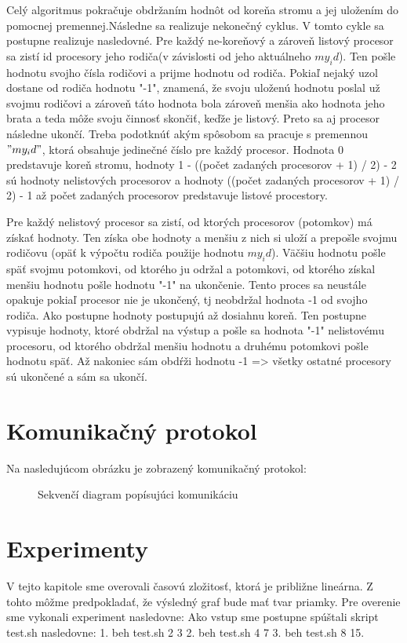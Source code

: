 \documentclass[11pt,a4paper,titlepage,final]{article}
\begin{document}
Celý algoritmus pokračuje obdržaním hodnôt od koreňa stromu a jej uložením do pomocnej premennej.Následne sa realizuje nekonečný cyklus. V tomto cykle sa postupne realizuje nasledovné. Pre každý ne-koreňový a zároveň listový procesor sa zistí id procesory jeho rodiča(v závislosti od jeho aktuálneho $my_id$). Ten pošle hodnotu svojho čísla rodičovi a prijme hodnotu od rodiča. Pokiaľ nejaký uzol dostane od rodiča hodnotu "-1", znamená,  že svoju uloženú hodnotu poslal už svojmu rodičovi a zároveň táto hodnota bola zároveň menšia ako hodnota jeho brata a teda môže svoju činnosť skončiť, keďže je listový. Preto sa aj procesor následne ukončí. Treba podotknúť akým spôsobom sa pracuje s premennou $"my_id"$, ktorá obsahuje jedinečné číslo pre každý procesor. Hodnota 0 predstavuje koreň stromu, hodnoty 1 - ((počet zadaných procesorov + 1) / 2) - 2 sú hodnoty nelistových procesorov a hodnoty ((počet zadaných procesorov + 1) / 2) - 1 až počet zadaných procesorov predstavuje listové procestory.

Pre každý nelistový procesor sa zistí, od ktorých procesorov (potomkov) má získať hodnoty. Ten získa obe hodnoty a menšiu z nich si uloží a prepošle svojmu rodičovu (opäť k výpočtu rodiča použije hodnotu $my_id$). Väčšiu hodnotu pošle späť svojmu potomkovi, od ktorého ju održal a potomkovi, od ktorého získal menšiu hodnotu pošle hodnotu "-1" na ukončenie.  Tento proces sa neustále opakuje pokiaľ procesor nie je ukončený, tj neobdržal hodnota -1 od svojho rodiča. Ako postupne hodnoty postupujú až dosiahnu koreň. Ten postupne vypisuje hodnoty, ktoré obdržal na výstup a pošle sa hodnota "-1" nelistovému procesoru, od ktorého obdržal menšiu hodnotu a druhému potomkovi pošle hodnotu späť. Až nakoniec sám obdŕži hodnotu -1 => všetky ostatné procesory sú ukončené a sám sa ukončí.


\section{Komunikačný protokol}
Na nasledujúcom obrázku je zobrazený komunikačný protokol:
 \begin{figure}[h]

\begin{center}
\caption{Sekvenčí diagram popísujúci komunikáciu}
\end{center}

\end{figure}


\section{Experimenty}
V tejto kapitole sme overovali časovú zložitosť, ktorá je približne lineárna. Z tohto môžme predpokladať, že výsledný graf bude mať tvar priamky. Pre overenie sme vykonali experiment nasledovne: Ako vstup sme postupne spúštali skript test.sh nasledovne: 1. beh test.sh 2 3 2. beh test.sh 4 7 3. beh test.sh 8 15.
\end{document}
